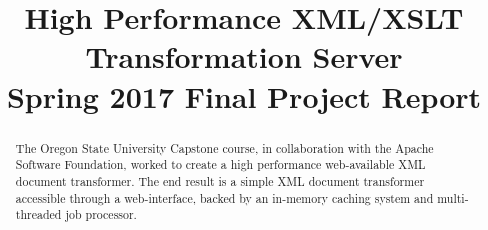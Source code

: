 

\renewcommand{\glossarysection}[2][]{}



\title{
	High Performance XML/XSLT Transformation Server \\
    {
    	\Large Spring 2017 Final Project Report
    }
}
\author{
}




\maketitle
\begin{abstract}
  The Oregon State University Capstone course, in collaboration with the Apache Software Foundation, worked to create a high performance web-available XML document transformer.
  The end result is a simple XML document transformer accessible through a web-interface, backed by an in-memory caching system and multi-threaded job processor.
\end{abstract}

